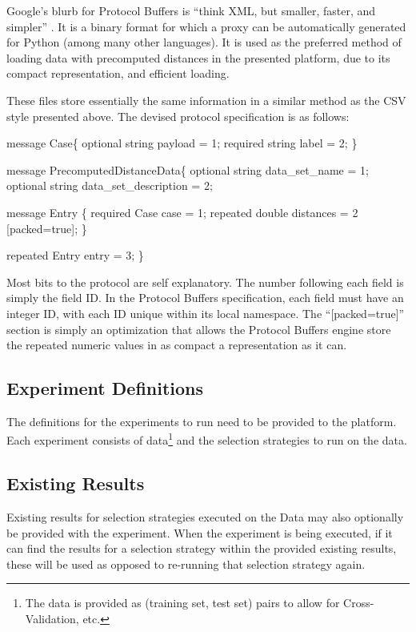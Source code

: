 \documentclass[a4paper,11pt]{report}
\begin{document}
Google's blurb for Protocol Buffers is ``think XML, but smaller, faster, and simpler'' \citep{prog:protocolbuffers}. It is a binary format for which a proxy can be automatically generated for Python (among many other languages). It is used as the preferred method of loading data with precomputed distances in the presented platform, due to its compact representation, and efficient loading.

These files store essentially the same information in a similar method as the CSV style presented above. The devised protocol specification is as follows:
 
\begin{code}
message Case\{
    optional string payload = 1;
    required string label = 2;
\}

message PrecomputedDistanceData\{
  optional string data_set_name = 1;
  optional string data_set_description = 2;
  
  message Entry \{
    required Case case = 1;
    repeated double distances = 2 [packed=true];
  \}
  
  repeated Entry entry = 3;
\}
\end{code}


Most bits to the protocol are self explanatory. The number following each field is simply the field ID. In the Protocol Buffers specification, each field must have an integer ID, with each ID unique within its local namespace. The ``[packed=true]'' section is simply an optimization that allows the Protocol Buffers engine store the repeated numeric values in as compact a representation as it can.

\subsection{Experiment Definitions}
The definitions for the experiments to run need to be provided to the platform. Each experiment consists of data\footnote{ The data is provided as (training set, test set) pairs to allow for Cross-Validation, etc.} and the selection strategies to run on the data.

\subsection{Existing Results}
Existing results for selection strategies executed on the Data may also optionally be provided with the experiment. When the experiment is being executed, if it can find the results for a selection strategy within the provided existing results, these will be used as opposed to re-running that selection strategy again.
\end{document}
